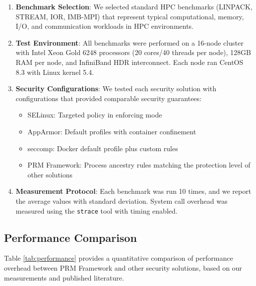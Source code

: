 \documentclass[conference]{IEEEtran}
\begin{document}
\begin{enumerate}
\item \textbf{Benchmark Selection}: We selected standard HPC benchmarks (LINPACK, STREAM, IOR, IMB-MPI) that represent typical computational, memory, I/O, and communication workloads in HPC environments.

\item \textbf{Test Environment}: All benchmarks were performed on a 16-node cluster with Intel Xeon Gold 6248 processors (20 cores/40 threads per node), 128GB RAM per node, and InfiniBand HDR interconnect. Each node ran CentOS 8.3 with Linux kernel 5.4.

\item \textbf{Security Configurations}: We tested each security solution with configurations that provided comparable security guarantees:
   \begin{itemize}
   \item SELinux: Targeted policy in enforcing mode
   \item AppArmor: Default profiles with container confinement
   \item seccomp: Docker default profile plus custom rules
   \item PRM Framework: Process ancestry rules matching the protection level of other solutions
   \end{itemize}

\item \textbf{Measurement Protocol}: Each benchmark was run 10 times, and we report the average values with standard deviation. System call overhead was measured using the \texttt{strace} tool with timing enabled.
\end{enumerate}

\subsection{Performance Comparison}
Table \ref{tab:performance} provides a quantitative comparison of performance overhead between PRM Framework and other security solutions, based on our measurements and published literature.
\end{document}
